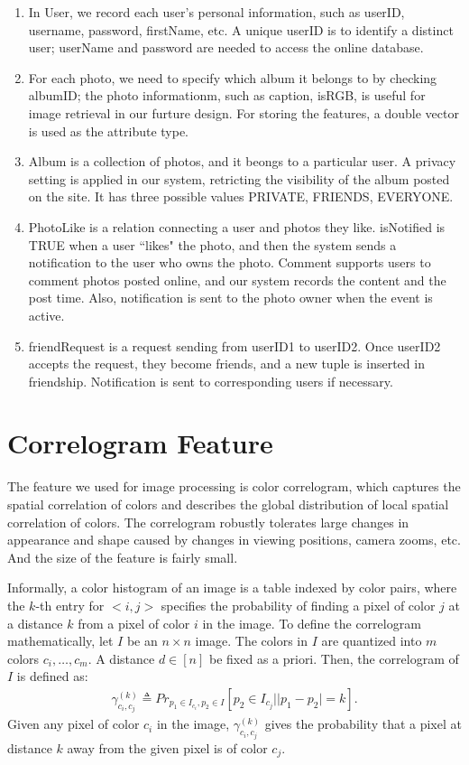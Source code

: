 \documentclass[10pt,twocolumn,letterpaper]{article}
\begin{document}
\begin{enumerate}
  \item In User, we record each user's personal information, such as userID, username, password, firstName, etc. A unique userID is to identify a distinct user; userName and password are needed to access the online database.
  \item For each photo, we need to specify which album it belongs to by checking albumID; the photo informationm, such as caption, isRGB, is useful for image retrieval in our furture design. For storing the features, a double vector is used as the attribute type.
  \item Album is a collection of photos, and it beongs to a particular user. A privacy setting is applied in our system, retricting the visibility of the album posted on the site. It has three possible values PRIVATE, FRIENDS, EVERYONE.
  \item PhotoLike is a relation connecting a user and photos they like. isNotified is TRUE when a user ``likes" the photo, and then the system sends a notification to the user who owns the photo. Comment supports users to comment photos posted online, and our system records the content and the post time. Also, notification is sent to the photo owner when the event is active.
  \item friendRequest is a request sending from userID1 to userID2. Once userID2 accepts the request, they become friends, and a new tuple is inserted in friendship. Notification is sent to corresponding users if necessary.
\end{enumerate}


\section{Correlogram Feature}
The feature we used for image processing is color correlogram, which captures the spatial correlation of colors and describes the global distribution of local spatial correlation of colors. The correlogram robustly tolerates large changes in appearance and shape caused by changes in viewing positions, camera zooms, etc. And the size of the feature is fairly small.

Informally, a color histogram of an image is a table indexed by color pairs, where the $k$-th entry for $<i,j>$ specifies the probability of finding a pixel of color $j$ at a distance $k$ from a pixel of color $i$ in the image. To define the correlogram mathematically, let $I$ be an $n \times n$ image. The colors in $I$ are quantized into $m$ colors $c_{i},\ldots,c_{m}$. A distance $d \in [n]$ be fixed as a priori. Then, the correlogram of $I$ is defined as:
\begin{equation}
	\begin{aligned}
		\gamma_{c_{i},c_{j}}^{(k)} \triangleq Pr_{p_{1} \in I_{c_{i}},p_{2} \in I} [p_{2} \in I_{c_{j}}||p_{1}-p_{2}|=k].
	\end{aligned}
\end{equation}
Given any pixel of color $c_{i}$ in the image, $\gamma_{c_{i},c_{j}}^{(k)}$ gives the probability that a pixel at distance $k$ away from the given pixel is of color $c_{j}$.
\end{document}

